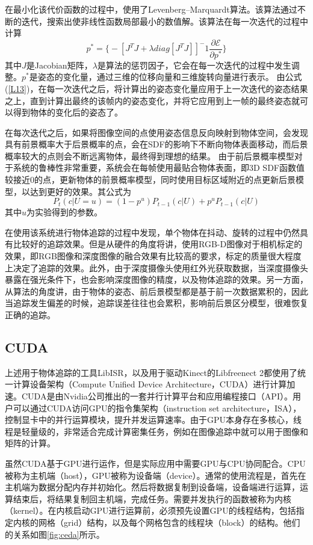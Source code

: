 在最小化该代价函数的过程中，使用了Levenberg–Marquardt算法。该算法通过不断的迭代，搜索出使非线性函数局部最小的数值解。该算法在每一次迭代的过程中计算
\begin{equation}\label{L13}
p^*=\Big\{-[J^TJ + \lambda diag[J^TJ]]^-1\frac{\partial\mathscr{E}}{\partial p^*}\Big\}
\end{equation}
其中$J$是Jacobian矩阵，$\lambda$是算法的惩罚因子，它会在每一次迭代的过程中发生调整。$p^*$是姿态的变化量，通过三维的位移向量和三维旋转向量进行表示。
由公式(\ref{L13})，在每一次迭代之后，将计算出的姿态变化量应用于上一次迭代的姿态结果之上，直到计算出最终的该帧内的姿态变化，并将它应用到上一帧的最终姿态就可以得到物体的变化后的姿态了。

在每次迭代之后，如果将图像空间的点使用姿态信息反向映射到物体空间，会发现具有前景概率大于后景概率的点，会在SDF的影响下不断向物体表面移动，而后景概率较大的点则会不断远离物体，最终得到理想的结果。
由于前后景概率模型对于系统的鲁棒性非常重要，系统会在每帧使用最贴合物体表面，即3D SDF函数值较接近0的点，更新物体的前景概率模型，同时使用目标区域附近的点更新后景模型，以达到更好的效果。其公式为
\begin{equation}
P_t(c|U=u)=(1-p^u)P_{t-1}(c|U) + p^uP_{t-1}(c|U)
\end{equation}
其中$u$为实验得到的参数。

在使用该系统进行物体追踪的过程中发现，单个物体在抖动、旋转的过程中仍然具有比较好的追踪效果。但是从硬件的角度将讲，使用RGB-D图像对于相机标定的效果，即RGB图像和深度图像的融合效果有比较高的要求，标定的质量很大程度上决定了追踪的效果。此外，由于深度摄像头使用红外光获取数据，当深度摄像头暴露在强光条件下，也会影响深度图像的精度，以及物体追踪的效果。另一方面，从算法的角度讲，由于物体的姿态、前后景模型都是基于前一次数据累积的，因此当追踪发生偏差的时候，追踪误差往往也会累积，影响前后景区分模型，很难恢复正确的追踪。

\subsection{CUDA}
上述用于物体追踪的工具LibISR，以及用于驱动Kinect的Libfreenect 2都使用了统一计算设备架构\cite{CUDARef}（Compute Unified Device Architecture，CUDA）进行计算加速。CUDA是由Nvidia公司推出的一套并行计算平台和应用编程接口（API）。用户可以通过CUDA访问GPU的指令集架构（instruction set architecture，ISA），控制显卡中的并行运算模块，提升并发运算速率。由于GPU本身存在多核心，线程是轻量级的，非常适合完成计算密集任务，例如在图像追踪中就可以用于图像和矩阵的计算。

虽然CUDA基于GPU进行运作，但是实际应用中需要GPU与CPU协同配合。CPU被称为主机端（host），GPU被称为设备端（device）。通常的使用流程是，首先在主机端为数据分配内存并初始化。然后将数据复制到设备端，设备端进行运算，运算结束后，将结果复制回主机端，完成任务。需要并发执行的函数被称为内核（kernel）。在内核启动GPU进行运算前，必须预先设置GPU的线程结构，包括指定内核的网格（grid）结构，以及每个网格包含的线程块（block）的结构。他们的关系如图\ref{fig:ceda}所示。

